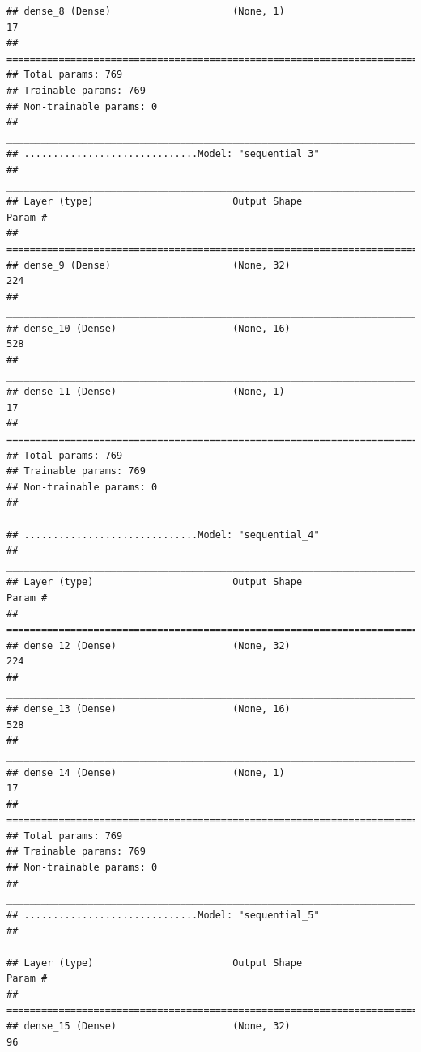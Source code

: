 \documentclass[
]{article}
\begin{document}
\begin{verbatim}
## dense_8 (Dense)                     (None, 1)                       17          
## ================================================================================
## Total params: 769
## Trainable params: 769
## Non-trainable params: 0
## ________________________________________________________________________________
## ..............................Model: "sequential_3"
## ________________________________________________________________________________
## Layer (type)                        Output Shape                    Param #     
## ================================================================================
## dense_9 (Dense)                     (None, 32)                      224         
## ________________________________________________________________________________
## dense_10 (Dense)                    (None, 16)                      528         
## ________________________________________________________________________________
## dense_11 (Dense)                    (None, 1)                       17          
## ================================================================================
## Total params: 769
## Trainable params: 769
## Non-trainable params: 0
## ________________________________________________________________________________
## ..............................Model: "sequential_4"
## ________________________________________________________________________________
## Layer (type)                        Output Shape                    Param #     
## ================================================================================
## dense_12 (Dense)                    (None, 32)                      224         
## ________________________________________________________________________________
## dense_13 (Dense)                    (None, 16)                      528         
## ________________________________________________________________________________
## dense_14 (Dense)                    (None, 1)                       17          
## ================================================================================
## Total params: 769
## Trainable params: 769
## Non-trainable params: 0
## ________________________________________________________________________________
## ..............................Model: "sequential_5"
## ________________________________________________________________________________
## Layer (type)                        Output Shape                    Param #     
## ================================================================================
## dense_15 (Dense)                    (None, 32)                      96          

\end{verbatim}
\end{document}
